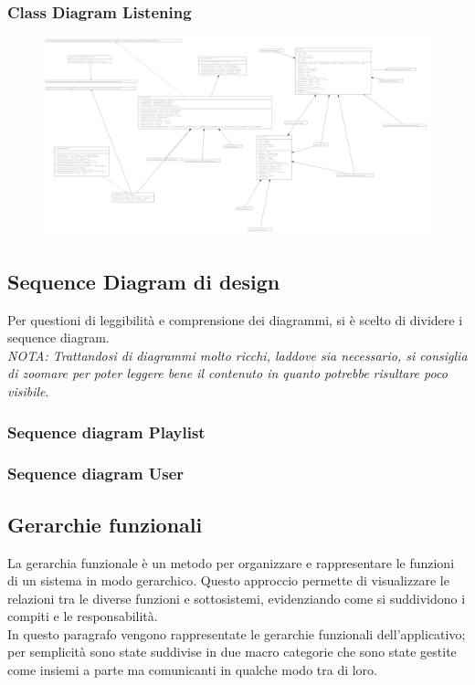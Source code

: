 \documentclass{article}
\begin{document}
		\subsubsection{Class Diagram Listening}
		\begin{figure}[H]
			\centering
			\includegraphics[width=1.0\textwidth]{Immagini/classdiagramdesignlistening}
		\end{figure}
		\newpage
		\subsection{Sequence Diagram di design}
		Per questioni di leggibilità e comprensione dei diagrammi, si è scelto di dividere i sequence diagram.\\
		\textit{NOTA: Trattandosi di diagrammi molto ricchi, laddove sia necessario, si consiglia di zoomare per poter leggere bene il contenuto in quanto potrebbe risultare poco visibile}.
		\subsubsection{Sequence diagram Playlist}
		
		\subsubsection{Sequence diagram User}
		
		\newpage
		\subsection{Gerarchie funzionali}
		La gerarchia funzionale è un metodo per organizzare e rappresentare le funzioni di un sistema in modo gerarchico. Questo approccio permette di visualizzare le relazioni tra le diverse funzioni e sottosistemi, evidenziando come si suddividono i compiti e le responsabilità.\\
		In questo paragrafo vengono rappresentate le gerarchie funzionali dell’applicativo; per semplicità sono state suddivise in due macro categorie che sono state gestite come insiemi a parte ma comunicanti in qualche modo tra di loro.
\end{document}
